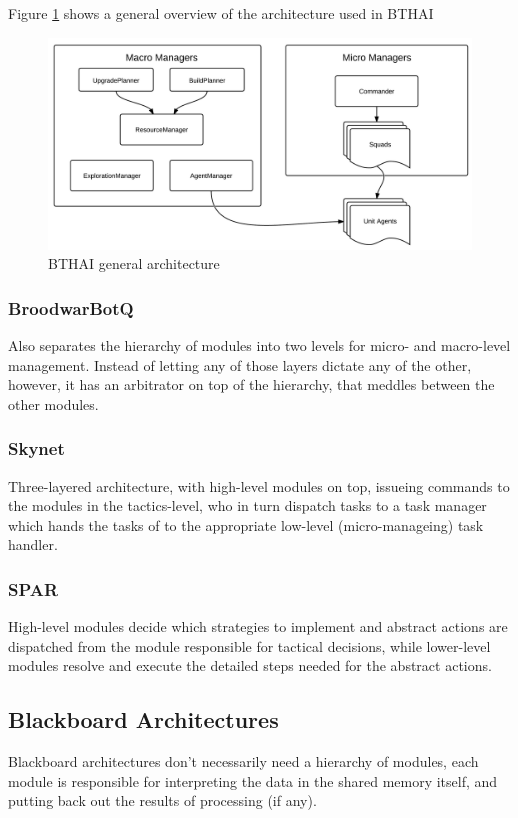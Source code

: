 Figure \ref{fig:bthaiarch} shows a general overview of the architecture used in BTHAI

\begin{figure}[h!tbp]
\centering
\includegraphics[scale=0.8]{graphics/bthai.png}
\caption{BTHAI general architecture}
\label{fig:bthaiarch}
\end{figure}

\subsubsection{BroodwarBotQ}
Also separates the hierarchy of modules into two levels for micro- and
macro-level management. Instead of letting any of those layers dictate any of
the other, however, it has an arbitrator on top of the hierarchy, that meddles
between the other modules.

\subsubsection{Skynet}
Three-layered architecture, with high-level modules on top, issueing commands
to the modules in the tactics-level, who in turn dispatch tasks to a task
manager which hands the tasks of to the appropriate low-level
(micro-manageing) task handler.

\subsubsection{SPAR}
High-level modules decide which strategies to implement and abstract actions
are dispatched from the module responsible for tactical decisions, while
lower-level modules resolve and execute the detailed steps needed for the
abstract actions.

\subsection{Blackboard Architectures}
Blackboard architectures don't necessarily need a hierarchy of modules, each
module is responsible for interpreting the data in the shared memory itself,
and putting back out the results of processing (if any).

